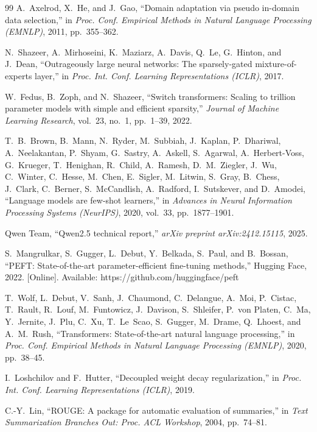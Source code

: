\documentclass[preprint,12pt]{elsarticle}
\begin{document}
\begin{thebibliography}{99}
A.~Axelrod, X.~He, and J.~Gao,
``Domain adaptation via pseudo in-domain data selection,'' in
\textit{Proc. Conf. Empirical Methods in Natural Language Processing (EMNLP)},
2011, pp.~355--362.

N.~Shazeer, A.~Mirhoseini, K.~Maziarz, A.~Davis, Q.~Le, G.~Hinton, and
J.~Dean, ``Outrageously large neural networks: The sparsely-gated
mixture-of-experts layer,'' in
\textit{Proc. Int. Conf. Learning Representations (ICLR)}, 2017.

W.~Fedus, B.~Zoph, and N.~Shazeer,
``Switch transformers: Scaling to trillion parameter models with simple and
efficient sparsity,''
\textit{Journal of Machine Learning Research}, vol.~23, no.~1, pp.~1--39, 2022.

T.~B.~Brown, B.~Mann, N.~Ryder, M.~Subbiah, J.~Kaplan, P.~Dhariwal,
A.~Neelakantan, P.~Shyam, G.~Sastry, A.~Askell, S.~Agarwal, A.~Herbert-Voss,
G.~Krueger, T.~Henighan, R.~Child, A.~Ramesh, D.~M.~Ziegler, J.~Wu,
C.~Winter, C.~Hesse, M.~Chen, E.~Sigler, M.~Litwin, S.~Gray, B.~Chess,
J.~Clark, C.~Berner, S.~McCandlish, A.~Radford, I.~Sutskever, and D.~Amodei,
``Language models are few-shot learners,'' in
\textit{Advances in Neural Information Processing Systems (NeurIPS)}, 2020,
vol.~33, pp.~1877--1901.

Qwen Team,
``Qwen2.5 technical report,''
\textit{arXiv preprint arXiv:2412.15115}, 2025.

S.~Mangrulkar, S.~Gugger, L.~Debut, Y.~Belkada, S.~Paul, and B.~Bossan,
``PEFT: State-of-the-art parameter-efficient fine-tuning methods,''
Hugging Face, 2022. [Online]. Available: https://github.com/huggingface/peft

T.~Wolf, L.~Debut, V.~Sanh, J.~Chaumond, C.~Delangue, A.~Moi, P.~Cistac,
T.~Rault, R.~Louf, M.~Funtowicz, J.~Davison, S.~Shleifer, P.~von Platen,
C.~Ma, Y.~Jernite, J.~Plu, C.~Xu, T.~Le~Scao, S.~Gugger, M.~Drame,
Q.~Lhoest, and A.~M.~Rush, ``Transformers: State-of-the-art natural language
processing,'' in \textit{Proc. Conf. Empirical Methods in Natural Language
Processing (EMNLP)}, 2020, pp.~38--45.

I.~Loshchilov and F.~Hutter,
``Decoupled weight decay regularization,'' in
\textit{Proc. Int. Conf. Learning Representations (ICLR)}, 2019.

C.-Y.~Lin,
``ROUGE: A package for automatic evaluation of summaries,'' in
\textit{Text Summarization Branches Out: Proc. ACL Workshop}, 2004,
pp.~74--81.


\end{thebibliography}
\end{document}
